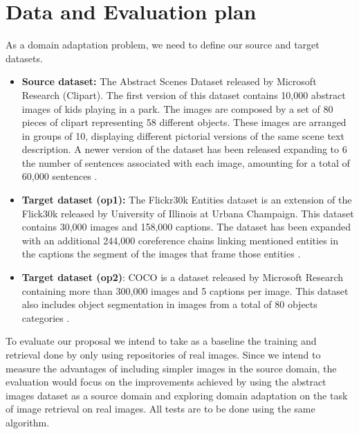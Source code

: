 \documentclass[11pt]{article}
\begin{document}
\section{Data and Evaluation plan}

As a domain adaptation problem, we need to define our source and target datasets. 

\begin{itemize}
\item \textbf{Source dataset:} The Abstract Scenes Dataset released by Microsoft Research (Clipart). The first version of this dataset contains 10,000 abstract images of kids playing in a park. The images are composed by a set of 80 pieces of clipart representing 58 different objects. These images are arranged in groups of 10, displaying different pictorial versions of the same scene text description. A newer version of the dataset has been released expanding to 6 the number of sentences associated with each image, amounting for a total of 60,000 sentences \cite{Zitnick_2013_ICCV_Workshops}. 
\item \textbf{Target dataset (op1):} The Flickr30k Entities dataset is an extension of the Flick30k released by University of Illinois at Urbana Champaign. This dataset contains 30,000 images and 158,000 captions. The dataset has been expanded with an additional 244,000 coreference chains linking mentioned entities in the captions the segment of the images that frame those entities \cite{DBLP:journals/corr/PlummerWCCHL15}. 
\item \textbf{Target dataset (op2)}: COCO is a dataset released by Microsoft Research containing more than 300,000 images and 5 captions per image. This dataset also includes object segmentation in images from a total of 80 objects categories \cite{DBLP:journals/corr/LinMBHPRDZ14}. 
\end{itemize}


To evaluate our proposal we intend to take as a baseline the training and retrieval done by only using repositories of real images. Since we intend to measure the advantages of including simpler images in the source domain, the evaluation would focus on the improvements achieved by using the abstract images dataset as a source domain and exploring domain adaptation on the task of image retrieval on real images. All tests are to be done using the same algorithm. 



\nocite{*}


\end{document}
